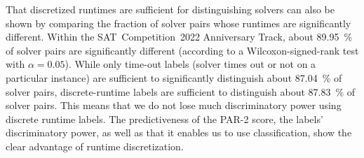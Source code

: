 \documentclass[runningheads]{llncs}
\begin{document}
That discretized runtimes are sufficient for distinguishing solvers can also be shown by comparing the fraction of solver pairs whose runtimes are significantly different.
Within the SAT~Competition~2022 Anniversary Track, about \SI{89.95}{\%} of solver pairs are significantly different (according to a Wilcoxon-signed-rank test with $\alpha = 0.05$).
While only time-out labels (solver times out or not on a particular instance) are sufficient to significantly distinguish about \SI{87.04}{\%} of solver pairs, discrete-runtime labels are sufficient to distinguish about \SI{87.83}{\%} of solver pairs.
This means that we do not lose much discriminatory power using discrete runtime labels.
The predictiveness of the PAR-2 score, the labels' discriminatory power, as well as that it enables us to use classification, show the clear advantage of runtime discretization.
\end{document}
